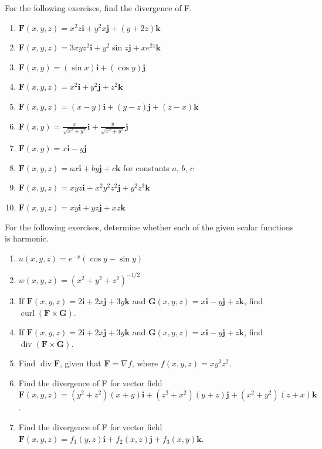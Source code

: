 \documentclass{exercises}
\begin{document}
For the following exercises, find the divergence of F.

\begin{enumerate}[resume]
\item $\mathbf{F}(x,y,z)=x^{2}z\mathbf{i}+y^{2}x\mathbf{j}+(y+2z)\mathbf{k}$
\item $\mathbf{F}(x,y,z)=3xyz^{2}\mathbf{i}+y^{2}\sin z\mathbf{j}+xe^{2z}\mathbf{k}$
\item $\mathbf{F}(x,y)=(\sin x)\mathbf{i}+(\cos y)\mathbf{j}$
\item $\mathbf{F}(x,y,z)=x^{2}\mathbf{i}+y^{2}\mathbf{j}+z^{2}\mathbf{k}$
\item $\mathbf{F}(x,y,z)=(x-y)\mathbf{i}+(y-z)\mathbf{j}+(z-x)\mathbf{k}$
\item $\mathbf{F}(x,y)=\frac{x}{\sqrt{x^{2}+y^{2}}}\mathbf{i}+\frac{y}{\sqrt{x^{2}+y^{2}}}\mathbf{j}$
\item $\mathbf{F}(x,y)=x\mathbf{i}-y\mathbf{j}$
\item $\mathbf{F}(x,y,z)=ax\mathbf{i}+by\mathbf{j}+c\mathbf{k}$ for constants $a$, $b$, $c$
\item $\mathbf{F}(x,y,z)=xyz\mathbf{i}+x^{2}y^{2}z^{2}\mathbf{j}+y^{2}z^{3}\mathbf{k}$
\item $\mathbf{F}(x,y,z)=xy\mathbf{i}+yz\mathbf{j}+xz\mathbf{k}$
\end{enumerate}

For the following exercises, determine whether each of the given scalar functions is harmonic.

\begin{enumerate}[resume]
\item $u(x,y,z)=e^{-x}(\cos y-\sin y)$
\item $w(x,y,z)={(x^{2}+y^{2}+z^{2})}^{-1/2}$
\item If $\mathbf{F}(x,y,z)=2\mathbf{i}+2x\mathbf{j}+3y\mathbf{k}$ and $\mathbf{G}(x,y,z)=x\mathbf{i}-y\mathbf{j}+z\mathbf{k}$, find $\operatorname{curl}(\mathbf{F}\times \mathbf{G})$.
\item If $\mathbf{F}(x,y,z)=2\mathbf{i}+2x\mathbf{j}+3y\mathbf{k}$ and $\mathbf{G}(x,y,z)=x\mathbf{i}-y\mathbf{j}+z\mathbf{k}$, find $\operatorname{div}(\mathbf{F}\times \mathbf{G})$.
\item Find $\operatorname{div}\mathbf{F}$, given that $\mathbf{F}=\nabla f$, where $f(x,y,z)=xy^{3}z^{2}$.
\item Find the divergence of F for vector field $\mathbf{F}(x,y,z)=(y^{2}+z^{2})(x+y)\mathbf{i}+(z^{2}+x^{2})(y+z)\mathbf{j}+(x^{2}+y^{2})(z+x)\mathbf{k}$.
\item Find the divergence of F for vector field $\mathbf{F}(x,y,z)=f_{1}(y,z)\mathbf{i}+f_{2}(x,z)\mathbf{j}+f_{3}(x,y)\mathbf{k}$.
\end{enumerate}
\end{document}

